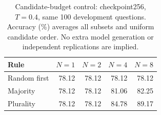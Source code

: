 \begin{table}[t]
\centering
\caption{Candidate-budget control: checkpoint256, $T=0.4$, same 100 development questions. Accuracy (\%) averages all subsets and uniform candidate order. No extra model generation or independent replications are implied.}
\label{tab:candidate_budget}
\footnotesize
\setlength{\tabcolsep}{4pt}
\begin{tabular}{lrrrr}
\toprule
Rule & $N=1$ & $N=2$ & $N=4$ & $N=8$\\
\midrule
Random first & 78.12 & 78.12 & 78.12 & 78.12\\
Majority & 78.12 & 78.12 & 81.06 & 82.25\\
Plurality & 78.12 & 78.12 & 84.78 & 89.17\\
\bottomrule
\end{tabular}
\end{table}
